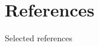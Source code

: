 \documentclass[xcolor={dvipsnames}]{beamer}
\renewcommand{\footnotesize}{\scriptsize}
\begin{document}
\section{References}
\begin{frame}[noframenumbering]{Selected references}
\renewcommand*{\bibfont}{\footnotesize}
    \printbibliography

\end{frame}
\end{document}
